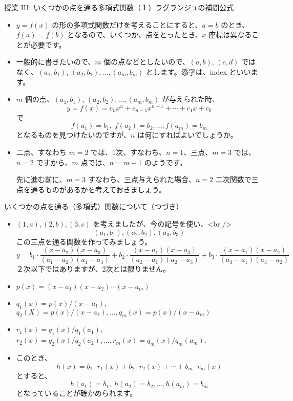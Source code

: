 \documentclass[10pt, dvipdfmx]{beamer}
\begin{document}
\begin{frame}{授業 III: いくつかの点を通る多項式関数（１）}{ラグランジュの補間公式}
\begin{itemize}
\item \(y = f(x)\) の形の多項式関数だけを考えることにすると、\(a = b\) のとき、\(f(a) = f(b)\) となるので、いくつか、点をとったとき、\(x\) 座標は異なることが必要です。
\item 一般的に書きたいので、\(m\) 個の点などとしたいので、\((a,b)\), \((c,d)\) ではなく、\((a_1, b_1)\), \((a_2, b_2), \ldots, (a_m, b_m)\) とします。添字は、index といいます。
\item \(m\) 個の点、\((a_1, b_1)\), \((a_2, b_2), \ldots, (a_m, b_m)\) が与えられた時、
\[ y = f(x) = c_nx^n + c_{n-1}x^{n-1} + \cdots + c_1x+c_0 \] 
で
\[ f(a_1) = b_1, \; f(a_2) = b_2, \ldots, f(a_m) = b_m \] 
となるものを見つけたいのですが、\(n\) は何にすればよいでしょうか。
\item 二点、すなわち \(m=2\) では、1次、すなわち、\(n=1\)、三点、\(m=3\) では、\(n=2\) ですから、\(m\) 点では、\(n = m-1\) のようです。

先に進む前に、\(m=3\) すなわち、三点与えられた場合、\(n=2\) 二次関数で三点を通るものがあるかを考えておきましょう。
\end{itemize}
\end{frame}
\begin{frame}{いくつかの点を通る（多項式）関数について（つづき）}
\begin{itemize}
\item \((1,a), (2,b), (3,c)\) を考えましたが、今の記号を使い、<br />
\[ (a_1, b_1), (a_2, b_2), (a_3, b_3) \] 
この三点を通る関数を作ってみましょう。
\[ y = b_1\cdot \frac{(x-a_2)(x-a_3)}{(a_1-a_2)(a_1-a_3)} + b_2\cdot\frac{(x-a_1)(x-a_3)}{(a_2-a_1)(a_2-a_3)} + b_3\cdot\frac{(x-a_1)(x-a_2)}{(a_3-a_1)(a_3-a_2)} \] 
２次以下ではありますが、2次とは限りません。\par
\item \(p(x) = (x-a_1)(x-a_2)\cdots (x-a_m)\)
\item \(q_1(x) = p(x)/(x-a_1)\), \(q_2(X) = p(x)/(x-a_2), \ldots, q_m(x) = p(x)/(x-a_m)\)
\item \(r_1(x) = q_1(x)/q_1(a_1)\), \(r_2(x) = q_2(x)/q_2(a_2), \ldots, r_m(x) = q_m(x)/q_m(a_m)\).
\item このとき、   
\[ h(x) = b_1\cdot r_1(x) + b_2\cdot r_2(x) + \cdots + b_m\cdot r_m(x) \] 
とすると、 
\[ h(a_1) = b_1, \; h(a_2) = b_2, \ldots, h(a_m) = b_m \] 
となっていることが確かめられます。
\end{itemize}
\end{frame}
\end{document}
